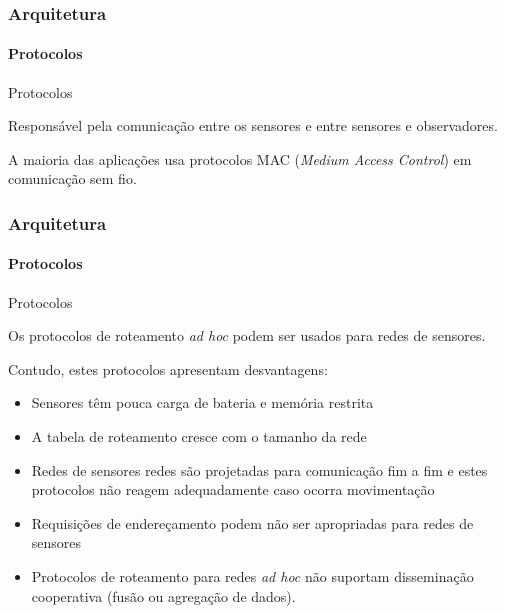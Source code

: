 \documentclass[notes]{beamer}
\begin{document}
\begin{frame}
\label{slide_46}
\frametitle{Arquitetura}
\framesubtitle{Protocolos}

\begin{block}{Protocolos}

Responsável pela comunicação entre os sensores e entre sensores e observadores. 
\end{block} \pause

\begin{block}

A maioria das aplicações usa protocolos MAC (\textit{Medium Access Control}) em comunicação sem fio. 

\end{block}

\end{frame}

\begin{frame}
\label{slide_47}
\frametitle{Arquitetura}
\framesubtitle{Protocolos}

\begin{block}{Protocolos}

Os protocolos de roteamento \textit{ad hoc} podem ser
usados para redes de sensores.

\end{block} \pause

\begin{alertblock}

Contudo, estes protocolos apresentam desvantagens: \pause

\begin{itemize}

\item Sensores têm pouca carga de bateria e memória restrita \pause

\item A tabela de roteamento cresce com o tamanho da rede \pause

\item Redes de sensores redes são projetadas para comunicação fim a fim e estes protocolos não reagem adequadamente caso ocorra movimentação \pause

\item Requisições de endereçamento podem não ser
apropriadas para redes de sensores \pause

\item Protocolos de roteamento para redes \textit{ad hoc} não suportam disseminação cooperativa (fusão ou agregação de dados). 

\end{itemize}

\end{alertblock}

\end{frame}
\end{document}
